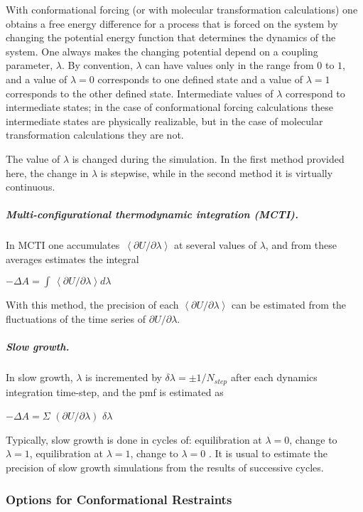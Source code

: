 With conformational forcing (or with molecular transformation calculations)
one obtains a free energy difference for a process that is forced on the
system by changing the potential energy function that determines the
dynamics of the system. One always makes the changing potential depend on a
coupling parameter, $\lambda $. By convention, $\lambda $ can have values
only in the range from $0$ to $1$, and a value of $\lambda =0$ corresponds
to one defined state and a value of $\lambda =1$ corresponds to the other
defined state. Intermediate values of $\lambda $ correspond to intermediate
states; in the case of conformational forcing calculations these
intermediate states are physically realizable, but in the case of molecular
transformation calculations they are not.

The value of $\lambda $ is changed during the simulation. In the first
method provided here, the change in $\lambda $ is stepwise, while in the
second method it is virtually continuous.\medskip

\subparagraph*{Multi-configurational thermodynamic integration (MCTI).}

In MCTI one accumulates $\,\left\langle \partial U/\partial \lambda
\right\rangle $ at several values of $\lambda $, and from these averages
estimates the integral

\qquad \qquad \qquad \qquad $-\Delta A=\int \,\left\langle \partial U/%
\partial \lambda \right\rangle d\lambda $

With this method, the precision of each $\left\langle \partial U/\partial %
\lambda \right\rangle $ can be estimated from the fluctuations of the time
series of $\partial U/\partial \lambda $.\bigskip 

\subparagraph*{Slow growth.}

In slow growth, $\lambda $ is incremented by $\delta \lambda =\pm 1/N_{step}$
after each dynamics integration time-step, and the pmf is estimated as

\qquad \qquad \qquad \qquad $-\Delta A=\Sigma $ $\left( \partial U/\partial
\lambda \right) $ $\delta \lambda $

Typically, slow growth is done in cycles of: equilibration at $\lambda =0$,
change to $\lambda =1$, equilibration at $\lambda =1$, change to $\lambda =0$%
. It is usual to estimate the precision of slow growth simulations from the
results of successive cycles.\pagebreak 

\subsubsection{Options for Conformational Restraints}

